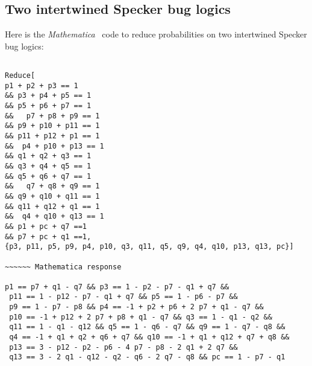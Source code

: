 \documentclass[%
  twocolumn,
 showpacs,
 showkeys,
 preprintnumbers,
 amsmath,amssymb,
 aps,
  pra,
  longbibliography,
 floatfix,
 ]{revtex4-1}
\begin{document}
\subsection{Two intertwined Specker bug logics}
\label{2017-b-bugscombinoa}

Here is the {\em Mathematica}~\cite{Mathematica11.1} code to reduce probabilities on two intertwined Specker bug logics:

{ \begin{lstlisting}[backgroundcolor=\color{yellow!10},framerule=0pt,breaklines=true, frame=tb]

Reduce[
p1 + p2 + p3 == 1
&& p3 + p4 + p5 == 1
&& p5 + p6 + p7 == 1
&&   p7 + p8 + p9 == 1
&& p9 + p10 + p11 == 1
&& p11 + p12 + p1 == 1
&&  p4 + p10 + p13 == 1
&& q1 + q2 + q3 == 1
&& q3 + q4 + q5 == 1
&& q5 + q6 + q7 == 1
&&   q7 + q8 + q9 == 1
&& q9 + q10 + q11 == 1
&& q11 + q12 + q1 == 1
&&  q4 + q10 + q13 == 1
&& p1 + pc + q7 ==1
&& p7 + pc + q1 ==1,
{p3, p11, p5, p9, p4, p10, q3, q11, q5, q9, q4, q10, p13, q13, pc}]

~~~~~~ Mathematica response

p1 == p7 + q1 - q7 && p3 == 1 - p2 - p7 - q1 + q7 &&
 p11 == 1 - p12 - p7 - q1 + q7 && p5 == 1 - p6 - p7 &&
 p9 == 1 - p7 - p8 && p4 == -1 + p2 + p6 + 2 p7 + q1 - q7 &&
 p10 == -1 + p12 + 2 p7 + p8 + q1 - q7 && q3 == 1 - q1 - q2 &&
 q11 == 1 - q1 - q12 && q5 == 1 - q6 - q7 && q9 == 1 - q7 - q8 &&
 q4 == -1 + q1 + q2 + q6 + q7 && q10 == -1 + q1 + q12 + q7 + q8 &&
 p13 == 3 - p12 - p2 - p6 - 4 p7 - p8 - 2 q1 + 2 q7 &&
 q13 == 3 - 2 q1 - q12 - q2 - q6 - 2 q7 - q8 && pc == 1 - p7 - q1

\end{lstlisting}  }
\end{document}
